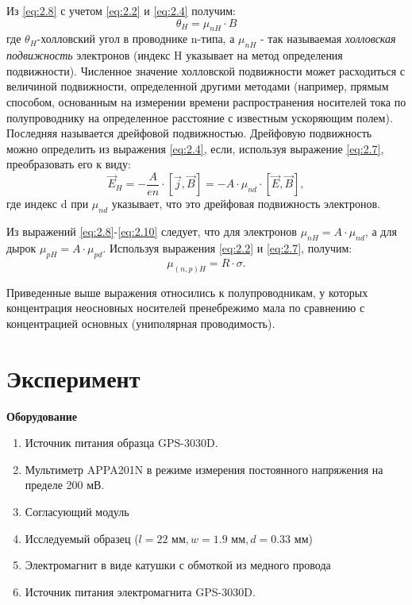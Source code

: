 Из \ref{eq:2.8} с учетом \ref{eq:2.2} и \ref{eq:2.4} получим:
\begin{equation}
\label{eq:2.9}
	\theta_H = \mu_{nH} \cdot B
\end{equation}
где $\theta_H$-холловский угол в проводнике n-типа, а $\mu_{nH}$ - так называемая \textit{холловская подвижность} электронов (индекс H указывает на метод определения подвижности). Численное значение холловской подвижности может расходиться с величиной подвижности, определенной другими методами (например, прямым способом, основанным на измерении времени распространения носителей тока по полупроводнику на определенное расстояние с известным ускоряющим полем). Последняя называется дрейфовой подвижностью. Дрейфовую подвижность можно определить из выражения \ref{eq:2.4}, если, используя выражение \ref{eq:2.7}, преобразовать его к виду:
\begin{equation}
\label{eq:2.10}
	\vec E_H = -\frac{A}{en}\cdot[\vec j, \vec B]=-A\cdot \mu_{nd} \cdot [\vec E,\vec B],
\end{equation}
где индекс d при $\mu_{nd}$ указывает, что это дрейфовая подвижность электронов.

Из выражений \eqref{eq:2.8}-\eqref{eq:2.10} следует, что для электронов $\mu_{nH}=A\cdot \mu_{nd}$, а для дырок $\mu_{pH}=A\cdot \mu_{pd}$. Используя выражения \eqref{eq:2.2} и \eqref{eq:2.7}, получим:
\begin{equation}
\label{eq:2.11}
	\mu_{(n,p)H}=R\cdot \sigma.
\end{equation}

Приведенные выше выражения относились к полупроводникам, у которых концентрация неосновных носителей пренебрежимо мала
по сравнению с концентрацией основных (униполярная проводимость). 

\newpage
\section*{Эксперимент}
\textbf{Оборудование}
\begin{enumerate}
\item Источник питания образца GPS-3030D.
\item Мультиметр APPA201N в режиме измерения постоянного напряжения на пределе 200 мВ.
\item Согласующий модуль
\item Исследуемый образец ($l = 22 \text{ мм},w = 1.9 \text{ мм}, d = 0.33 \text{ мм}$)
\item Электромагнит в виде катушки с обмоткой из медного провода
\item Источник питания электромагнита GPS-3030D.
\end{enumerate}

